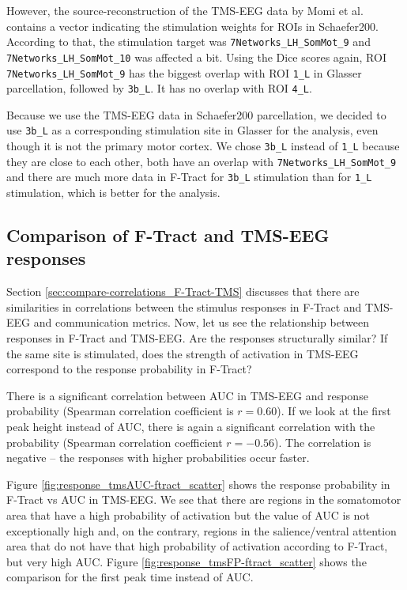 However, the source-reconstruction of the TMS-EEG data by Momi et al. \cite{momi_tms-evoked_2023} contains a vector indicating the stimulation weights for ROIs in Schaefer200. According to that, the stimulation target was \texttt{7Networks\_LH\_SomMot\_9} and \texttt{7Networks\_LH\_SomMot\_10} was affected a bit. Using the Dice scores again, ROI \texttt{7Networks\_LH\_SomMot\_9} has the biggest overlap with ROI \texttt{1\_L} in Glasser parcellation, followed by \texttt{3b\_L}. It has no overlap with ROI \texttt{4\_L}.

Because we use the TMS-EEG data in Schaefer200 parcellation, we decided to use \texttt{3b\_L} as a corresponding stimulation site in Glasser for the analysis, even though it is not the primary motor cortex. We chose \texttt{3b\_L} instead of \texttt{1\_L} because they are close to each other, both have an overlap with \texttt{7Networks\_LH\_SomMot\_9} and there are much more data in F-Tract for \texttt{3b\_L} stimulation than for \texttt{1\_L} stimulation, which is better for the analysis. 

\subsection{Comparison of F-Tract and TMS-EEG responses}

Section \ref{sec:compare-correlations_F-Tract-TMS} discusses that there are similarities in correlations between the stimulus responses in F-Tract and TMS-EEG and communication metrics. Now, let us see the relationship between responses in F-Tract and TMS-EEG. Are the responses structurally similar? If the same site is stimulated, does the strength of activation in TMS-EEG correspond to the response probability in F-Tract?

There is a significant correlation between AUC in TMS-EEG and response probability (Spearman correlation coefficient is $r=0.60$). If we look at the first peak height instead of AUC, there is again a significant correlation with the probability (Spearman correlation coefficient $r=-0.56$). The correlation is negative -- the responses with higher probabilities occur faster. 

Figure \ref{fig:response_tmsAUC-ftract_scatter} shows the response probability in F-Tract vs AUC in TMS-EEG. We see that there are regions in the somatomotor area that have a high probability of activation but the value of AUC is not exceptionally high and, on the contrary, regions in the salience/ventral attention area that do not have that high probability of activation according to F-Tract, but very high AUC. Figure \ref{fig:response_tmsFP-ftract_scatter} shows the comparison for the first peak time instead of AUC. 

